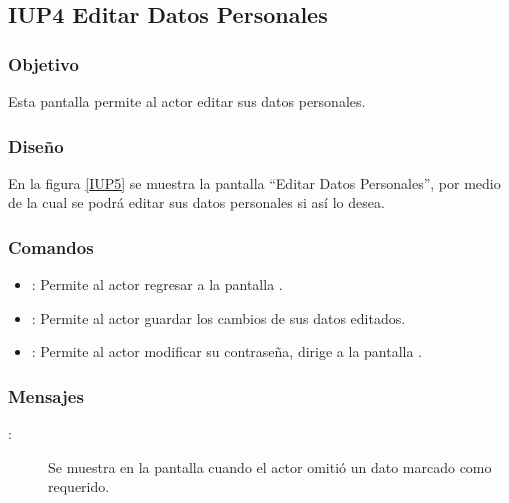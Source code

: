 \subsection{IUP4 Editar Datos Personales}
 
\subsubsection{Objetivo}

    Esta pantalla permite al actor editar sus datos personales.

\subsubsection{Diseño}

    En la figura \ref{IUP5} se muestra la pantalla ``Editar Datos Personales'', por medio de la cual se podrá editar sus datos personales si así lo desea. \\


\subsubsection{Comandos}
\begin{itemize}
    \item {}: Permite al actor regresar a la pantalla .
    \item {}: Permite al actor guardar los cambios de sus datos editados.
    \item {}: Permite al actor modificar su contraseña, dirige a la pantalla .
\end{itemize}

\subsubsection{Mensajes}

\begin{description}
    \item[:] Se muestra en la pantalla  cuando el actor omitió un dato marcado como requerido.
\end{description}

